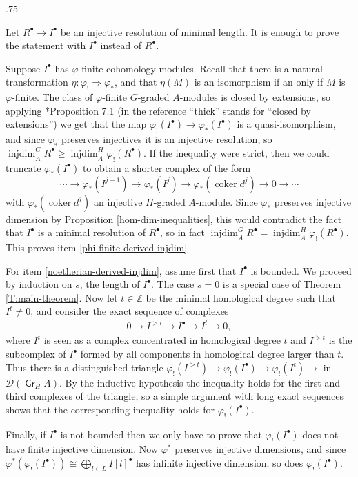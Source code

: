 \documentclass[11pt,fleqn]{article}
\makeatletter
\renewenvironment{proof}[1][\textit{Proof}]{\par
 \pushQED{\qed}%
 \normalfont \topsep.75\paraskip\relax
 \trivlist
 \item[\hskip\labelsep
    \itshape
  #1\@addpunct{.}]\ignorespaces
}{%
 \popQED\endtrivlist\@endpefalse
}
\newcommand\ZZ{\mathbb Z}
\renewcommand\to{\longrightarrow}
\renewcommand\phi{\varphi}
\newcommand\D{\mathcal D}
\DeclareMathOperator\Gr{\mathsf{Gr}}
\DeclareMathOperator\injdim{injdim}
\DeclareMathOperator\coker{coker}
\makeatother
\begin{document}
\begin{proof}
Let $R^\bullet \to I^\bullet$ be an injective resolution of minimal length.
It is enough to prove the statement with $I^\bullet$ instead of $R^\bullet$.

Suppose $I^\bullet$ has $\phi$-finite cohomology modules. Recall that there is 
a natural transformation $\eta: \phi_! \Rightarrow \phi_*$, and that $\eta(M)$ 
is an isomorphism if an only if $M$ is $\phi$-finite. The class of 
$\phi$-finite $G$-graded $A$-modules is closed by extensions, so applying 
\cite{Hart-RD}*{Proposition 7.1} (in the reference ``thick'' stands for 
``closed by extensions'') we get that the map $\phi_!(I^\bullet) \to 
\phi_*(I^\bullet)$ is a quasi-isomorphism, and since $\phi_*$ preserves 
injectives it is an injective resolution, so $\injdim_A^{G} R^\bullet \geq 
\injdim_A^H \phi_!(R^\bullet)$. If the inequality were strict, then we could 
truncate $\phi_*(I^\bullet)$ to obtain a shorter complex of the form
\[
\cdots 
 \to \phi_*(I^{j-1}) 
 \to \phi_*(I^{j}) 
 \to \phi_*(\coker d^j) 
 \to 0 
 \to \cdots
\]
with $\phi_*(\coker d^j)$ an injective $H$-graded $A$-module. Since $\phi_*$
preserves injective dimension by Proposition \ref{hom-dim-inequalities}, this
would contradict the fact that $I^\bullet$ is a minimal resolution of 
$R^\bullet$, so in fact $\injdim_A^{G} R^\bullet = \injdim_A^H 
\phi_!(R^\bullet)$. This proves item \ref{phi-finite-derived-injdim}

For item \ref{noetherian-derived-injdim}, assume first that $I^\bullet$ is 
bounded. We proceed by induction on $s$, the length of $I^\bullet$. The case 
$s = 0$ is a special case of Theorem \ref{T:main-theorem}. Now let $t \in \ZZ$ 
be the minimal homological degree such that $I^t \neq 0$, and consider the 
exact sequence of complexes
\begin{align*}
0 \to I^{> t} \to I^\bullet \to I^t \to 0,
\end{align*}
where $I^t$ is seen as a complex concentrated in homological degree $t$ and
$I^{> t}$ is the subcomplex of $I^\bullet$ formed by all components in 
homological degree larger than $t$. Thus there is a distinguished triangle
$\phi_!(I^{> t}) \to \phi_!(I^\bullet) \to \phi_!(I^t) \to$ in $\D(\Gr_H A)$.
By the inductive hypothesis the inequality holds for the first and third 
complexes of the triangle, so a simple argument with long exact sequences 
shows that the corresponding inequality holds for $\phi_!(I^\bullet)$.

Finally, if $I^\bullet$ is not bounded then we only have to prove that 
$\phi_!(I^\bullet)$ does not have finite injective dimension. Now $\phi^*$
preserves injective dimensions, and since $\phi^*(\phi_!(I^\bullet)) \cong 
\bigoplus_{l \in L} I[l]^\bullet$ has infinite injective dimension, so does
$\phi_!(I^\bullet)$.
\end{proof}
\end{document}
